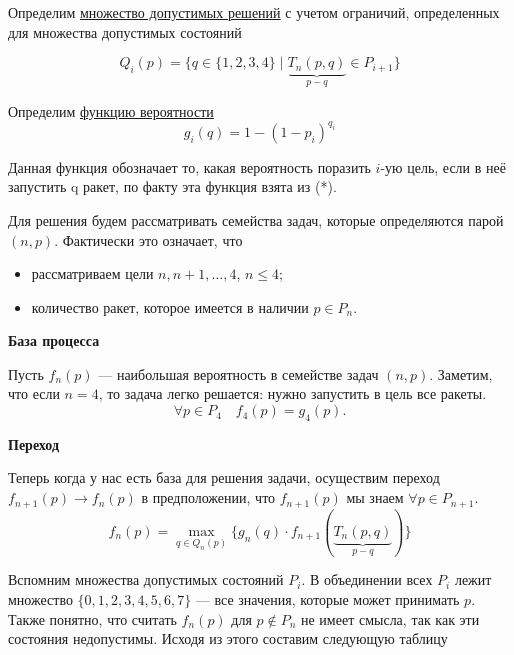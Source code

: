 \bigskip

Определим \underline{множество допустимых решений} с учетом ограничий, определенных для множества допустимых состояний

\[Q_i(p) = \{q \in \{1, 2, 3, 4\} \; \big| \; \underbrace{T_n(p, q)}_{p - q} \in P_{i + 1} \}\]

\bigskip

Определим \underline{функцию вероятности}
\[g_i(q) = 1 - (1 - p_i)^{q_i}\]

Данная функция обозначает то, какая вероятность поразить $i$-ую цель, если в неё запустить q ракет, по факту эта функция взята из (*). 

\bigskip

Для решения будем рассматривать семейства задач, которые определяются парой $(n, p)$. Фактически это означает, что

\begin{itemize}[nosep]
	\item рассматриваем цели $n, n+1, \dots, 4$, $n \le 4$;
	
	\item количество ракет, которое имеется в наличии $p \in P_n$.
\end{itemize}

\bigskip

\textbf{База процесса}

Пусть $f_n(p)$ --- наибольшая вероятность в семействе задач $(n, p)$. Заметим, что если $n = 4$, то задача легко решается: нужно запустить в цель все ракеты.
\[
\forall p \in P_4 \quad f_4(p) = g_4(p).
\]

\bigskip

\textbf{Переход}

Теперь когда у нас есть база для решения задачи, осуществим переход $f_{n+1}(p) \to f_n(p)$ в предположении, что $f_{n+1}(p)$ мы знаем $\forall p \in P_{n + 1}$.
\[
\boxed{f_n(p) = \max_{q \in Q_n(p)} \Big\{ g_n(q) \cdot f_{n + 1}(\underbrace{T_n(p, q)}_{p - q}) \Big\}}\tag{**}
\]

Вспомним множества допустимых состояний $P_i$. В объединении всех $P_i$ лежит множество $\{0, 1, 2, 3, 4, 5, 6, 7\}$ --- все значения, которые может принимать $p$. Также понятно, что считать $f_n(p)$ для $p \notin P_n$ не имеет смысла, так как эти состояния недопустимы. Исходя из этого составим следующую таблицу

